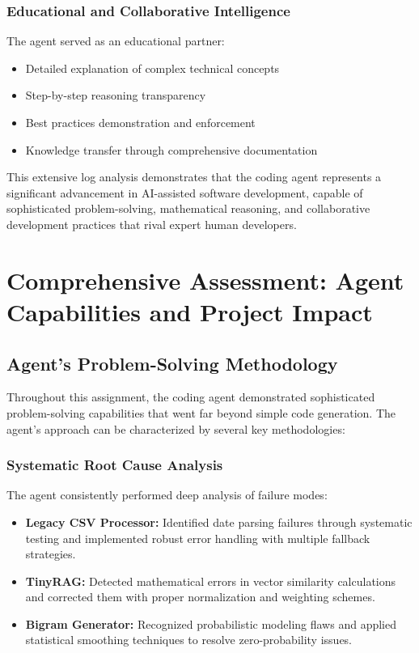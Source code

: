 \documentclass[12pt, a4paper]{article}
\begin{document}
\subsubsection{Educational and Collaborative Intelligence}
The agent served as an educational partner:
\begin{itemize}
    \item Detailed explanation of complex technical concepts
    \item Step-by-step reasoning transparency
    \item Best practices demonstration and enforcement
    \item Knowledge transfer through comprehensive documentation
\end{itemize}

This extensive log analysis demonstrates that the coding agent represents a significant advancement in AI-assisted software development, capable of sophisticated problem-solving, mathematical reasoning, and collaborative development practices that rival expert human developers.

\newpage
\section{Comprehensive Assessment: Agent Capabilities and Project Impact}

\subsection{Agent's Problem-Solving Methodology}

Throughout this assignment, the coding agent demonstrated sophisticated problem-solving capabilities that went far beyond simple code generation. The agent's approach can be characterized by several key methodologies:

\subsubsection{Systematic Root Cause Analysis}
The agent consistently performed deep analysis of failure modes:
\begin{itemize}
    \item \textbf{Legacy CSV Processor:} Identified date parsing failures through systematic testing and implemented robust error handling with multiple fallback strategies.
    \item \textbf{TinyRAG:} Detected mathematical errors in vector similarity calculations and corrected them with proper normalization and weighting schemes.
    \item \textbf{Bigram Generator:} Recognized probabilistic modeling flaws and applied statistical smoothing techniques to resolve zero-probability issues.
\end{itemize}
\end{document}
